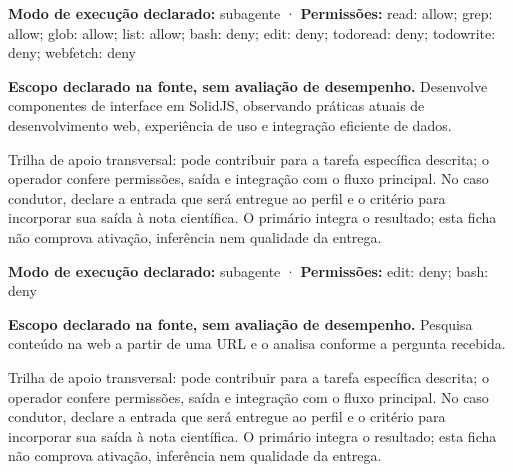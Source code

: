 \begin{arquitetura}
\textbf{Modo de execução declarado:} subagente · \textbf{Permissões:} read: allow; grep: allow; glob: allow; list: allow; bash: deny; edit: deny; todoread: deny; todowrite: deny; webfetch: deny
\end{arquitetura}


\begin{descricao}
\textbf{Escopo declarado na fonte, sem avaliação de desempenho.}
Desenvolve componentes de interface em SolidJS, observando práticas atuais de desenvolvimento web, experiência de uso e integração eficiente de dados.
\end{descricao}

\begin{funcao}
Trilha de apoio transversal: pode contribuir para a tarefa específica descrita; o operador confere permissões, saída e integração com o fluxo principal. No caso condutor, declare a entrada que será entregue ao perfil e o critério para incorporar sua saída à nota científica. O primário integra o resultado; esta ficha não comprova ativação, inferência nem qualidade da entrega.
\end{funcao}

\begin{arquitetura}
\textbf{Modo de execução declarado:} subagente · \textbf{Permissões:} edit: deny; bash: deny
\end{arquitetura}


\begin{descricao}
\textbf{Escopo declarado na fonte, sem avaliação de desempenho.}
Pesquisa conteúdo na web a partir de uma URL e o analisa conforme a pergunta recebida.
\end{descricao}

\begin{funcao}
Trilha de apoio transversal: pode contribuir para a tarefa específica descrita; o operador confere permissões, saída e integração com o fluxo principal. No caso condutor, declare a entrada que será entregue ao perfil e o critério para incorporar sua saída à nota científica. O primário integra o resultado; esta ficha não comprova ativação, inferência nem qualidade da entrega.
\end{funcao}

